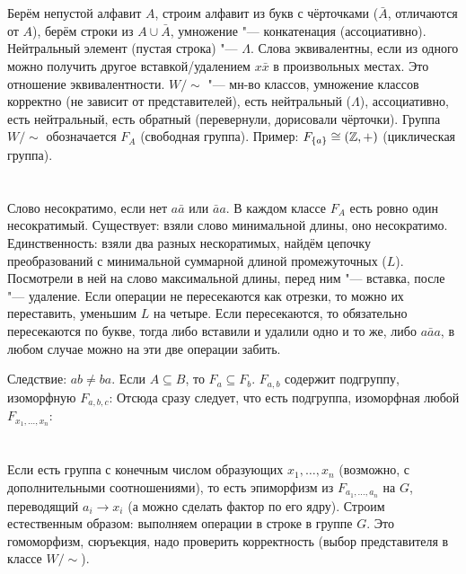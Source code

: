 \section{} %
Берём непустой алфавит $A$, строим алфавит из букв с чёрточками ($\bar A$, отличаются от $A$),
берём строки из $A\cup \bar A$, умножение "--- конкатенация (ассоциативно).
Нейтральный элемент (пустая строка) "--- $\Lambda$.
Слова эквивалентны, если из одного можно получить другое вставкой/удалением $x\bar x$ в произвольных местах.
Это отношение эквивалентности.
$W/\sim$ "--- мн-во классов, умножение классов корректно (не зависит от представителей),
есть нейтральный ($\Lambda$), ассоциативно, есть нейтральный, есть обратный (перевернули, дорисовали чёрточки).
Группа $W/\sim$ обозначается $F_A$ (свободная группа).
Пример: $F_{\{a\}} \cong (\mathbb{Z}, +)$ (циклическая группа).

\section{} %
Слово несократимо, если нет $a\bar a$ или $\bar a a$.
В каждом классе $F_A$ есть ровно один несократимый.
Существует: взяли слово минимальной длины, оно несократимо.
Единственность: взяли два разных нескоратимых, найдём цепочку преобразований с минимальной суммарной длиной промежуточных ($L$).
Посмотрели в ней на слово максимальной длины, перед ним "--- вставка, после "--- удаление.
Если операции не пересекаются как отрезки, то можно их переставить, уменьшим $L$ на четыре.
Если пересекаются, то обязательно пересекаются по букве, тогда либо вставили и удалили одно и то же,
либо $a\bar a a$, в любом случае можно на эти две операции забить.

Следствие: $ab\neq ba$.
Если $A \subseteq B$, то $F_a \subseteq F_b$.
$F_{a, b}$ содержит подгруппу, изоморфную $F_{a,b,c}$: \TODO
Отсюда сразу следует, что есть подгруппа, изоморфная любой $F_{x_1, \dots, x_n}$: \TODO

\section{} %
Если есть группа с конечным числом образующих $x_1, \dots, x_n$ (возможно, с дополнительными соотношениями),
то есть эпиморфизм из $F_{a_1, \dots, a_n}$ на $G$, переводящий $a_i \to x_i$ (а можно сделать фактор по его ядру).
Строим естественным образом: выполняем операции в строке в группе $G$.
Это гомоморфизм, сюръекция, надо проверить корректность (выбор представителя в классе $W/\sim$).

